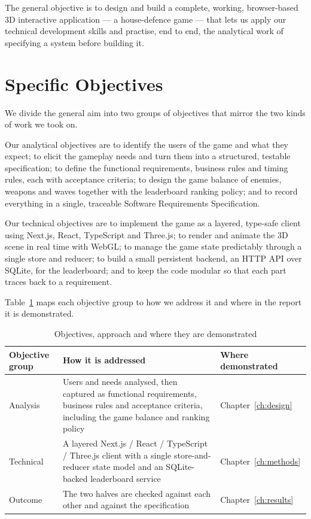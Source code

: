 \documentclass[12pt,a4paper]{report}
\begin{document}
The general objective is to design and build a complete, working,
browser-based 3D interactive application --- a house-defence game --- that lets
us apply our technical development skills and practise, end to end, the
analytical work of specifying a system before building it.

\section{Specific Objectives}

We divide the general aim into two groups of objectives that mirror the two
kinds of work we took on.

Our analytical objectives are to identify the users of the game and what they
expect; to elicit the gameplay needs and turn them into a structured, testable
specification; to define the functional requirements, business rules and timing
rules, each with acceptance criteria; to design the game balance of enemies,
weapons and waves together with the leaderboard ranking policy; and to record
everything in a single, traceable Software Requirements Specification.

Our technical objectives are to implement the game as a layered, type-safe
client using Next.js, React, TypeScript and Three.js; to render and animate the
3D scene in real time with WebGL; to manage the game state predictably through a
single store and reducer; to build a small persistent backend, an HTTP API over
SQLite, for the leaderboard; and to keep the code modular so that each part
traces back to a requirement.

Table~\ref{tab:objectives} maps each objective group to how we address it and
where in the report it is demonstrated.

\begin{table}[htbp]
\centering
\caption{Objectives, approach and where they are demonstrated}
\label{tab:objectives}
\begin{tabular}{|p{2.6cm}|p{6.2cm}|p{3.6cm}|}
\hline
Objective group & How it is addressed & Where demonstrated \\
\hline
Analysis &
Users and needs analysed, then captured as functional requirements, business
rules and acceptance criteria, including the game balance and ranking policy &
Chapter~\ref{ch:design} \\
\hline
Technical &
A layered Next.js / React / TypeScript / Three.js client with a single
store-and-reducer state model and an SQLite-backed leaderboard service &
Chapter~\ref{ch:methods} \\
\hline
Outcome &
The two halves are checked against each other and against the specification &
Chapter~\ref{ch:results} \\
\hline
\end{tabular}
\end{table}
\end{document}
